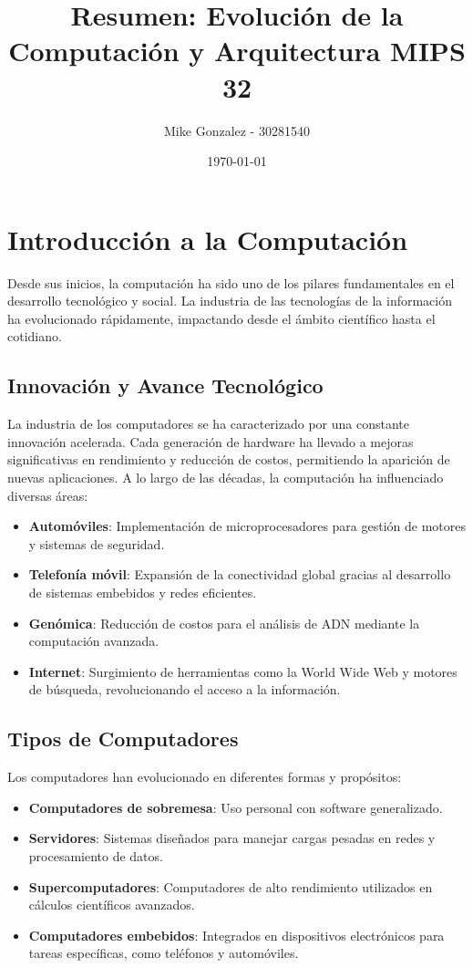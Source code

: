 \documentclass{article}
\title{Resumen: Evolución de la Computación y Arquitectura MIPS 32}
\author{Mike Gonzalez - 30281540}
\date{\today}
\begin{document}
\maketitle

\section{Introducción a la Computación}
Desde sus inicios, la computación ha sido uno de los pilares fundamentales en el desarrollo tecnológico y social. La industria de las tecnologías de la información ha evolucionado rápidamente, impactando desde el ámbito científico hasta el cotidiano.

\subsection{Innovación y Avance Tecnológico}
La industria de los computadores se ha caracterizado por una constante innovación acelerada. Cada generación de hardware ha llevado a mejoras significativas en rendimiento y reducción de costos, permitiendo la aparición de nuevas aplicaciones. A lo largo de las décadas, la computación ha influenciado diversas áreas:
\begin{itemize}
    \item \textbf{Automóviles}: Implementación de microprocesadores para gestión de motores y sistemas de seguridad.
    \item \textbf{Telefonía móvil}: Expansión de la conectividad global gracias al desarrollo de sistemas embebidos y redes eficientes.
    \item \textbf{Genómica}: Reducción de costos para el análisis de ADN mediante la computación avanzada.
    \item \textbf{Internet}: Surgimiento de herramientas como la World Wide Web y motores de búsqueda, revolucionando el acceso a la información.
\end{itemize}

\subsection{Tipos de Computadores}
Los computadores han evolucionado en diferentes formas y propósitos:
\begin{itemize}
    \item \textbf{Computadores de sobremesa}: Uso personal con software generalizado.
    \item \textbf{Servidores}: Sistemas diseñados para manejar cargas pesadas en redes y procesamiento de datos.
    \item \textbf{Supercomputadores}: Computadores de alto rendimiento utilizados en cálculos científicos avanzados.
    \item \textbf{Computadores embebidos}: Integrados en dispositivos electrónicos para tareas específicas, como teléfonos y automóviles.
\end{itemize}
\end{document}
